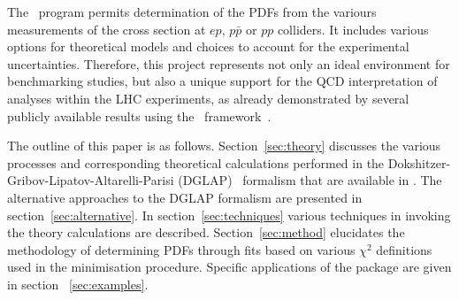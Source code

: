 %


The \fitter\ program permits determination of the PDFs from the variours measurements of the cross section at $ep$, $p\bar{p}$ or $pp$ colliders.  
 It includes various options for theoretical models and choices to account for the experimental uncertainties. Therefore, this project represents not only an ideal environment for benchmarking studies, but also a unique support for the QCD interpretation of analyses within the LHC experiments,
as already demonstrated by several publicly available results using the \fitter\ 
framework~\cite{atlas:strange,atlas:jets,atlas:hm,cms:strange,cms:jets,h1:2012kk,h1zeus:charm}.  

The outline of this paper is as follows.
%
Section~\ref{sec:theory} discusses the various processes 
and corresponding theoretical calculations performed in the Dokshitzer-Gribov-Lipatov-Altarelli-Parisi (DGLAP)~\cite{Gribov:1972ri,Gribov:1972rt,Lipatov:1974qm,
Dokshitzer:1977sg,Altarelli:1977zs} formalism that are available in \fitter.
The alternative approaches to the DGLAP formalism are presented in section~\ref{sec:alternative}.
%
In section~\ref{sec:techniques} various techniques in invoking the theory calculations are described.
Section~\ref{sec:method} elucidates the 
methodology of determining PDFs through fits based on various
 $\chi^2$ definitions used in the
minimisation procedure. 
%
Specific applications of the package are given in
section ~\ref{sec:examples}. 
%
